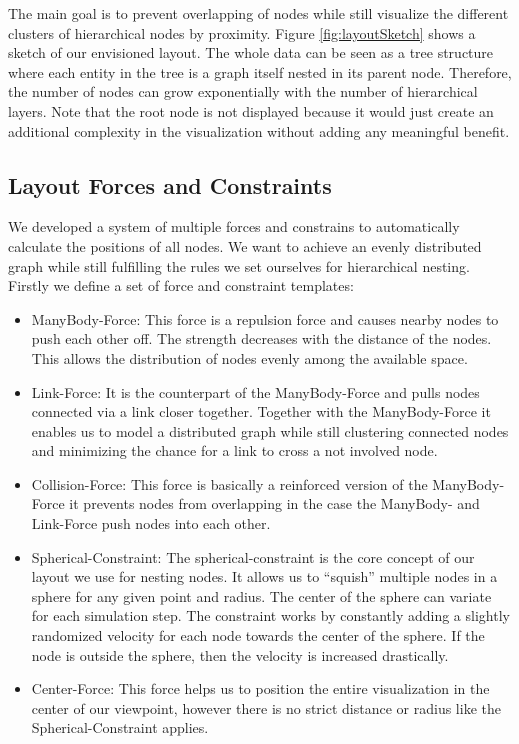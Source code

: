 The main goal is to prevent overlapping of nodes while still visualize the different clusters of hierarchical nodes by proximity. Figure \ref{fig:layoutSketch} shows a sketch of our envisioned layout. The whole data can be seen as a tree structure where each entity in the tree is a graph itself nested in its parent node. Therefore, the number of nodes can grow exponentially with the number of hierarchical layers. Note that the root node is not displayed because it would just create an additional complexity in the visualization without adding any meaningful benefit.

\subsection{Layout Forces and Constraints}
We developed a system of multiple forces and constrains to automatically calculate the positions of all nodes. We want to achieve an evenly distributed graph while still fulfilling the rules we set ourselves for hierarchical nesting. Firstly we define a set of force and constraint templates:
\begin{itemize}
    \item ManyBody-Force: This force is a repulsion force and causes nearby nodes to push each other off. The strength decreases with the distance of the nodes. This allows the distribution of nodes evenly among the available space.
    \item Link-Force: It is the counterpart of the ManyBody-Force and pulls nodes connected via a link closer together. Together with the ManyBody-Force it enables us to model a distributed graph while still clustering connected nodes and minimizing the chance for a link to cross a not involved node.
    \item Collision-Force: This force is basically a reinforced version of the ManyBody-Force it prevents nodes from overlapping in the case the ManyBody- and Link-Force push nodes into each other.
    \item Spherical-Constraint: The spherical-constraint is the core concept of our layout we use for nesting nodes. It allows us to “squish” multiple nodes in a sphere for any given point and radius. The center of the sphere can variate for each simulation step. The constraint works by constantly adding a slightly randomized velocity for each node towards the center of the sphere. If the node is outside the sphere, then the velocity is increased drastically.
    \item Center-Force: This force helps us to position the entire visualization in the center of our viewpoint, however there is no strict distance or radius like the Spherical-Constraint applies.
\end{itemize}

